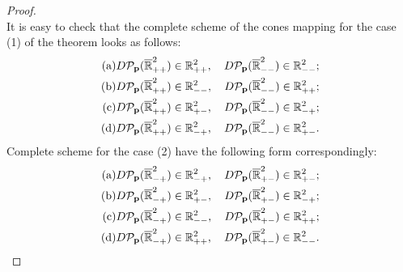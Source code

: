\begin{proof}
\begin{equation*}
	\end{equation*}
	It is easy to check that the complete scheme of the cones mapping for the case (1) of the theorem looks as follows:
	\begin{eqnarray*}
		(\textup{a}) & D \mathcal{P}_{\vb{p}} (\overline{\mathbb{R}}_{++}^2) \in \mathbb{R}_{++}^2, \quad D \mathcal{P}_{\vb{p}} (\overline{\mathbb{R}}_{--}^2) \in \mathbb{R}_{--}^2; \\
		(\textup{b}) & D \mathcal{P}_{\vb{p}} (\overline{\mathbb{R}}_{++}^2) \in \mathbb{R}_{--}^2, \quad D \mathcal{P}_{\vb{p}} (\overline{\mathbb{R}}_{--}^2) \in \mathbb{R}_{++}^2; \\
		(\textup{c}) & D \mathcal{P}_{\vb{p}} (\overline{\mathbb{R}}_{++}^2) \in \mathbb{R}_{+-}^2, \quad D \mathcal{P}_{\vb{p}} (\overline{\mathbb{R}}_{--}^2) \in \mathbb{R}_{-+}^2; \\
		(\textup{d}) & D \mathcal{P}_{\vb{p}} (\overline{\mathbb{R}}_{++}^2) \in \mathbb{R}_{-+}^2, \quad D \mathcal{P}_{\vb{p}} (\overline{\mathbb{R}}_{--}^2) \in \mathbb{R}_{+-}^2.
	\end{eqnarray*}
	Complete scheme for the case (2) have the following form correspondingly:
	\begin{eqnarray*}
		(\textup{a}) & D \mathcal{P}_{\vb{p}} (\overline{\mathbb{R}}_{-+}^2) \in \mathbb{R}_{-+}^2, \quad D \mathcal{P}_{\vb{p}} (\overline{\mathbb{R}}_{+-}^2) \in \mathbb{R}_{+-}^2; \\
		(\textup{b}) & D \mathcal{P}_{\vb{p}} (\overline{\mathbb{R}}_{-+}^2) \in \mathbb{R}_{+-}^2, \quad D \mathcal{P}_{\vb{p}} (\overline{\mathbb{R}}_{+-}^2) \in \mathbb{R}_{-+}^2; \\
		(\textup{c}) & D \mathcal{P}_{\vb{p}} (\overline{\mathbb{R}}_{-+}^2) \in \mathbb{R}_{--}^2, \quad D \mathcal{P}_{\vb{p}} (\overline{\mathbb{R}}_{+-}^2) \in \mathbb{R}_{++}^2; \\
		(\textup{d}) & D \mathcal{P}_{\vb{p}} (\overline{\mathbb{R}}_{-+}^2) \in \mathbb{R}_{++}^2, \quad D \mathcal{P}_{\vb{p}} (\overline{\mathbb{R}}_{+-}^2) \in \mathbb{R}_{--}^2.
	\end{eqnarray*}
	

\end{proof}
